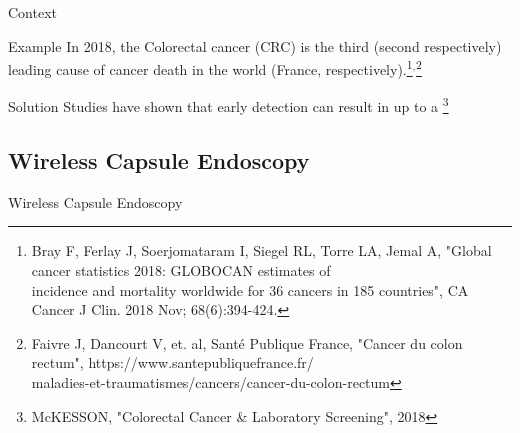 \documentclass{libs/ufc_format}
\begin{document}
\begin{frame}{Context}
    \begin{block}{Example}
        In 2018, the Colorectal cancer (CRC) is the third (second respectively) leading cause of cancer death in the world (France, respectively).\footnote[frame]{\tiny Bray F, Ferlay J, Soerjomataram I, Siegel RL, Torre LA, Jemal A, "Global cancer statistics 2018: GLOBOCAN estimates of \\ \hspace{0.3cm}incidence and mortality worldwide for 36 cancers in 185 countries", CA Cancer J Clin. 2018 Nov; 68(6):394-424.}$^{,}$\footnote[frame]{\tiny Faivre J, Dancourt V, et. al, Santé Publique France, "Cancer du colon rectum", https://www.santepubliquefrance.fr/\\maladies-et-traumatismes/cancers/cancer-du-colon-rectum}
    \end{block}
    \pause
    \begin{exampleblock}{Solution}
        Studies have shown that early detection can result in up to a \footnote[frame]{\tiny McKESSON, "Colorectal Cancer \& Laboratory Screening", 2018}
    \end{exampleblock}

\end{frame}


\subsection{Wireless Capsule Endoscopy}
\begin{frame}{Wireless Capsule Endoscopy}


    \pause


\end{frame}
\end{document}
